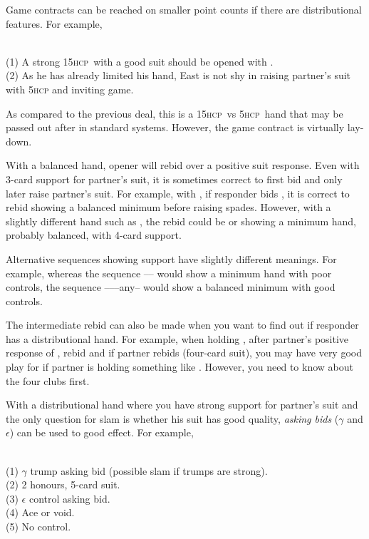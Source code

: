 \documentclass[a4paper,article,oneside]{memoir}
\newcommand{\gap}{\vspace{\baselineskip}}
\newcommand{\hcp}{\textsc{hcp}}
\begin{document}
\gap
Game contracts can be reached on smaller point counts if there are
distributional features. For example,

 \\ (1) A strong 15\hcp\ with a
good suit should be opened with .\\ (2) As he has already
limited his hand, East is not shy in raising partner's suit with 5\hcp
and inviting game.

As compared to the previous deal, this is a 15\hcp\ vs 5\hcp\ hand
that may be passed out after  in standard systems. However, the
game contract is virtually lay-down.

\gap
With a balanced hand, opener will rebid \nt{} over a positive suit
response.  Even with 3-card support for partner's suit, it is
sometimes correct to first bid \nt{} and only later raise partner's
suit. For example, with , if responder bids
, it is correct to rebid  showing a balanced minimum
before raising spades. However, with a slightly different hand such as
, the rebid could be  or  showing
a minimum hand, probably balanced, with 4-card support.

Alternative sequences showing support have slightly different
meanings.  For example, whereas the sequence ----
would show a minimum hand with poor controls, the sequence
------any-- would show a balanced minimum with
good controls.

The intermediate  rebid can also be made when you want to find
out if responder has a distributional hand. For example, when holding
, after partner's positive response of ,
rebid  and if partner rebids  (four-card suit), you may
have very good play for  if partner is holding something like
.  However, you need to know about the four
clubs first.

\gap
With a distributional hand where you have strong support for partner's
suit and the only question for slam is whether his suit has good
quality, \emph{asking bids} ($\gamma$ and $\epsilon$) can be used to
good effect. For example,

 \\
(1) $\gamma$ trump asking bid (possible slam if trumps are strong). \\
(2) 2 honours, 5-card suit. \\ (3) $\epsilon$ control asking bid. \\
(4) Ace or void. \\ (5) No control.
\end{document}
